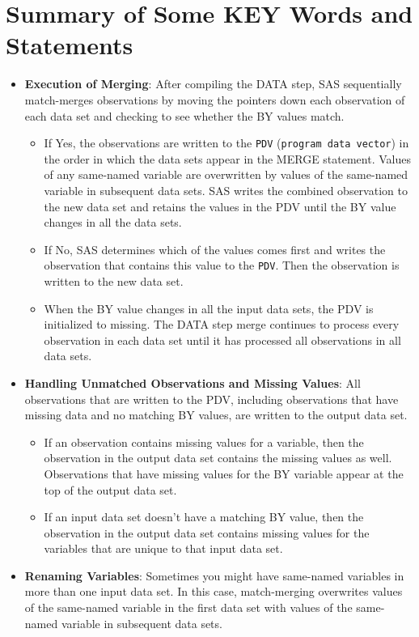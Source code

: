 \documentclass[
]{book}
\providecommand{\tightlist}{%
  \setlength{\itemsep}{0pt}\setlength{\parskip}{0pt}}
\begin{document}
\hypertarget{summary-of-some-key-words-and-statements}{%
\section{Summary of Some KEY Words and Statements}\label{summary-of-some-key-words-and-statements}}

\begin{itemize}
\tightlist
\item
  \textbf{Execution of Merging}: After compiling the DATA step, SAS sequentially match-merges observations by moving the pointers down each observation of each data set and checking to see whether the BY values match.

  \begin{itemize}
  \tightlist
  \item
    If Yes, the observations are written to the \texttt{PDV} (\texttt{program\ data\ vector}) in the order in which the data sets appear in the MERGE statement. Values of any same-named variable are overwritten by values of the same-named variable in subsequent data sets. SAS writes the combined observation to the new data set and retains the values in the PDV until the BY value changes in all the data sets.
  \item
    If No, SAS determines which of the values comes first and writes the observation that contains this value to the \texttt{PDV}. Then the observation is written to the new data set.
  \item
    When the BY value changes in all the input data sets, the PDV is initialized to missing. The DATA step merge continues to process every observation in each data set until it has processed all observations in all data sets.
  \end{itemize}
\item
  \textbf{Handling Unmatched Observations and Missing Values}: All observations that are written to the PDV, including observations that have missing data and no matching BY values, are written to the output data set.

  \begin{itemize}
  \tightlist
  \item
    If an observation contains missing values for a variable, then the observation in the output data set contains the missing values as well. Observations that have missing values for the BY variable appear at the top of the output data set.
  \item
    If an input data set doesn't have a matching BY value, then the observation in the output data set contains missing values for the variables that are unique to that input data set.
  \end{itemize}
\item
  \textbf{Renaming Variables}: Sometimes you might have same-named variables in more than one input data set. In this case, match-merging overwrites values of the same-named variable in the first data set with values of the same-named variable in subsequent data sets.


\end{itemize}
\end{document}
